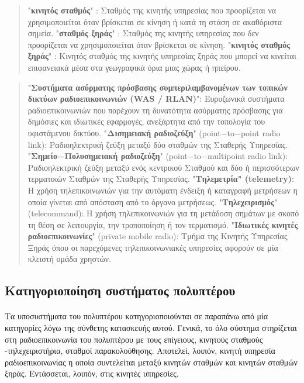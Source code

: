 \documentclass[a4paper, 12pt, twoside]{report}
\begin{document}
{{{{{{{\begin{quote}
				"\textbf{κινητός σταθμός}" : Σταθμός της κινητής υπηρεσίας που προορίζεται να χρησιμοποιείται όταν βρίσκεται σε κίνηση ή κατά τη στάση σε ακαθόριστα σημεία.\linebreak
				"\textbf{σταθμός ξηράς}" : Σταθμός της κινητής υπηρεσίας που δεν προορίζεται να χρησιμοποιείται όταν βρίσκεται σε κίνηση.\linebreak
				"\textbf{κινητός σταθμός ξηράς}" : Κινητός σταθμός της κινητής υπηρεσίας ξηράς που μπορεί να κινείται επιφανειακά μέσα στα γεωγραφικά όρια μιας χώρας ή ηπείρου. \cite[σελ. 4879]{ΦΕΚ2006Β399}
			\end{quote}
			\begin{quote}
				"\textbf{Συστήματα ασύρματης πρόσβασης συμπεριλαμβανομένων των τοπικών δικτύων ραδιοεπικοινωνιών (WAS / RLAN)}": Ευρυζωνικά συστήματα ραδιοεπικοινωνιών
που παρέχουν τη δυνατότητα ασύρματης πρόσβασης για δημόσιες και ιδιωτικές εφαρμογές, ανεξάρτητα από την τοπολογία του υφιστάμενου δικτύου.\linebreak
				"\textbf{Δισημειακή ραδιοζεύξη}" (point−to−point radio link): Ραδιοηλεκτρική ζεύξη μεταξύ δύο σταθμών της Σταθερής Υπηρεσίας.\linebreak
				"\textbf{Σημείο−Πολυσημειακή ραδιοζεύξη}" (point−to−multipoint radio link): Ραδιοηλεκτρική ζεύξη μεταξύ ενός κεντρικού Σταθμού και δύο ή περισσότερων τερματικών Σταθμών της Σταθερής Υπηρεσίας.\linebreak
				"\textbf{Τηλεμετρία" (telemetry)}: Η χρήση τηλεπικοινωνιών για την αυτόματη ένδειξη ή καταγραφή μετρήσεων η οποία γίνεται από απόσταση από το όργανο μετρήσεως.\linebreak
				"\textbf{Τηλεχειρισμός}" (telecommand): Η χρήση τηλεπικοινωνιών για τη μετάδοση σημάτων με σκοπό τη θέση σε λειτουργία, την τροποποίηση ή τον τερματισμό.\linebreak
				"\textbf{Ιδιωτικές κινητές ραδιοεπικοινωνίες}" (private mobile radio): Τμήμα της Κινητής Υπηρεσίας Ξηράς όπου οι παρεχόμενες τηλεπικοινωνιακές υπηρεσίες αφορούν σε μία κλειστή ομάδα χρηστών. \cite[Άρθρο 2, Ορισμοί]{ΦΕΚ2011Β2512}
			\end{quote}
			}
		
		\subsection{Κατηγοριοποίηση συστήματος πολυπτέρου}
			\paragraph{}{Τα υποσυστήματα του πολυπτέρου κατηγοριοποιούνται σε παραπάνω από μία κατηγορίες λόγω της σύνθετης κατασκευής αυτού. Γενικά, το όλο σύστημα στηρίζεται στη ραδιοεπικοινωνία του πολυπτέρου με τους επίγειους, κινητούς σταθμούς -τηλεχειριστήρια, σταθμοί παρακολούθησης. Αποτελεί, λοιπόν, κινητή υπηρεσία ραδιοεπικοινωνίας η οποία συντελείται μεταξύ κινητών σταθμών και κινητών σταθμών ξηράς. Εντάσσεται, λοιπόν, στις κινητές υπηρεσίες.
			}
}}}}}}
\end{document}
